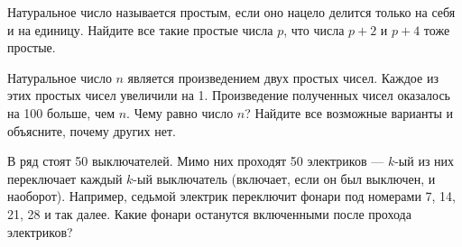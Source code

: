 ﻿
\begin{itemize}

\itA Натуральное число называется простым, если оно нацело делится только на себя и на единицу. Найдите все такие простые числа $p$, что числа $p+2$ и $p+4$ тоже простые.

\itB Натуральное число $n$ является произведением двух простых чисел. Каждое из этих простых чисел увеличили на 1. Произведение полученных чисел оказалось на 100 больше, чем $n$. Чему равно число $n$? Найдите все возможные варианты и объясните, почему других нет.

\itC В ряд стоят 50 выключателей. Мимо них проходят 50 электриков --- $k$-ый из них переключает каждый $k$-ый выключатель (включает, если он был выключен, и наоборот). Например, седьмой электрик переключит фонари под номерами 7, 14, 21, 28 и так далее. Какие фонари останутся включенными после прохода электриков?
\end{itemize}